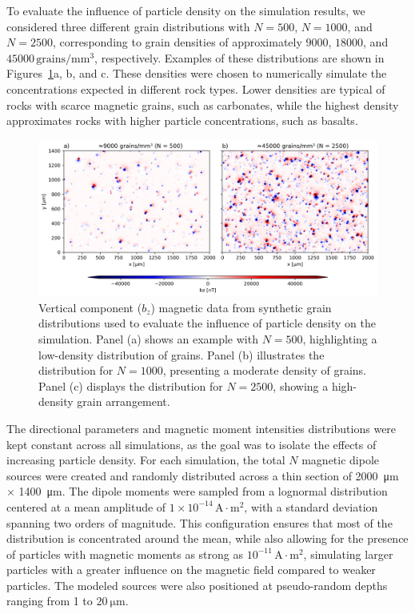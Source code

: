 To evaluate the influence of particle density on the simulation results, we considered three different grain distributions with \(N = 500\), \(N = 1000\), and \(N = 2500\), corresponding to grain densities of approximately \(9000\), \(18000\), and \(45000\,\mathrm{grains/mm^3}\), respectively. Examples of these distributions are shown in Figures~\ref{synthetic-data-maps}a, b, and c. These densities were chosen to numerically simulate the concentrations expected in different rock types. Lower densities are typical of rocks with scarce magnetic grains, such as carbonates, while the highest density approximates rocks with higher particle concentrations, such as basalts.

\begin{figure}[tb!]
  \centering
  \includegraphics[width=1.0\linewidth]{paper/figures/synthetic-different-densities-maps.png}
  \caption{
Vertical component (\(b_z\)) magnetic data from synthetic grain distributions used to evaluate the influence of particle density on the simulation. Panel (a) shows an example with \(N = 500\), highlighting a low-density distribution of grains. Panel (b) illustrates the distribution for \(N = 1000\), presenting a moderate density of grains. Panel (c) displays the distribution for \(N = 2500\), showing a high-density grain arrangement.
  }
  \label{synthetic-data-maps}
\end{figure}


The directional parameters and magnetic moment intensities distributions were kept constant across all simulations, as the goal was to isolate the effects of increasing particle density. For each simulation, the total \(N\) magnetic dipole sources were created and randomly distributed across a thin section of \qty{2000}{\um} \(\times\) \qty{1400}{\um}. The dipole moments were sampled from a lognormal distribution centered at a mean amplitude of \(1 \times 10^{-14}\,\mathrm{A \cdot m^2}\), with a standard deviation spanning two orders of magnitude. This configuration ensures that most of the distribution is concentrated around the mean, while also allowing for the presence of particles with magnetic moments as strong as \(10^{-11}\,\mathrm{A \cdot m^2}\), simulating larger particles with a greater influence on the magnetic field compared to weaker particles. The modeled sources were also positioned at pseudo-random depths ranging from 1 to \(\qty{20}{\micro\meter}\).

